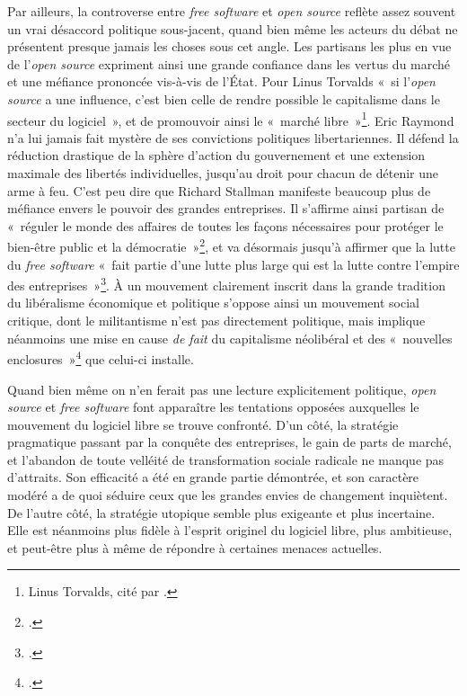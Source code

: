 \documentclass{FramateX}
\begin{document}
\begin{refsection}
Par ailleurs, la controverse entre \textit{free software} et
\textit{open source} reflète assez souvent un vrai désaccord politique
sous-jacent, quand bien même les acteurs du débat ne présentent presque
jamais les choses sous cet angle. Les partisans les plus en vue de
l'\textit{open source} expriment ainsi une grande confiance dans les
vertus du marché et une méfiance prononcée vis-à-vis de l'État. Pour
Linus Torvalds «~si l'\textit{open source} a une influence, c'est bien
celle de rendre possible le capitalisme dans le secteur du logiciel~»,
et de promouvoir ainsi le «~marché libre~»\footnote{Linus Torvalds,
cité par \cite[p.~109]{tapscottwikinomics.2006}.}. Eric Raymond n'a lui jamais fait
mystère de ses convictions politiques libertariennes. Il défend la
réduction drastique de la sphère d'action du gouvernement et une
extension maximale des libertés individuelles, jusqu'au droit pour
chacun de détenir une arme à feu. C'est peu dire que
Richard Stallman manifeste beaucoup plus de méfiance envers le pouvoir
des grandes entreprises. Il s'affirme ainsi partisan de «~réguler le
monde des affaires de toutes les façons nécessaires pour protéger le
bien-être public et la démocratie~»\footnote{\cite{stallmanrms2010}.}, et va
désormais jusqu'à affirmer que la lutte du
\textit{free software} «~fait partie d'une lutte plus
large qui est la lutte contre l'empire des
entreprises~»\footnote{\cite{stallmanavec2011}.}.
À un mouvement clairement inscrit dans la grande tradition du
libéralisme économique et politique s'oppose ainsi un
mouvement social critique, dont le militantisme n'est
pas directement politique, mais implique néanmoins une mise en cause
\textit{de fait} du capitalisme néolibéral et des «~nouvelles
enclosures~»\footnote{\cite{boylesecond2003}.} que celui-ci installe. 

Quand bien même on n'en ferait pas une lecture
explicitement politique, \textit{open source} et \textit{free software} font apparaître les tentations opposées auxquelles le mouvement du
logiciel libre se trouve confronté. D'un côté, la
stratégie pragmatique passant par la conquête des entreprises, le gain
de parts de marché, et l'abandon de toute velléité de
transformation sociale radicale ne manque pas
d'attraits. Son efficacité a été en grande partie
démontrée, et son caractère modéré a de quoi séduire ceux que les
grandes envies de changement inquiètent. De l'autre
côté, la stratégie utopique semble plus exigeante et plus incertaine.
Elle est néanmoins plus fidèle à l'esprit originel du
logiciel libre, plus ambitieuse, et peut-être plus à même de répondre à
certaines menaces actuelles. 


\end{refsection}
\end{document}
